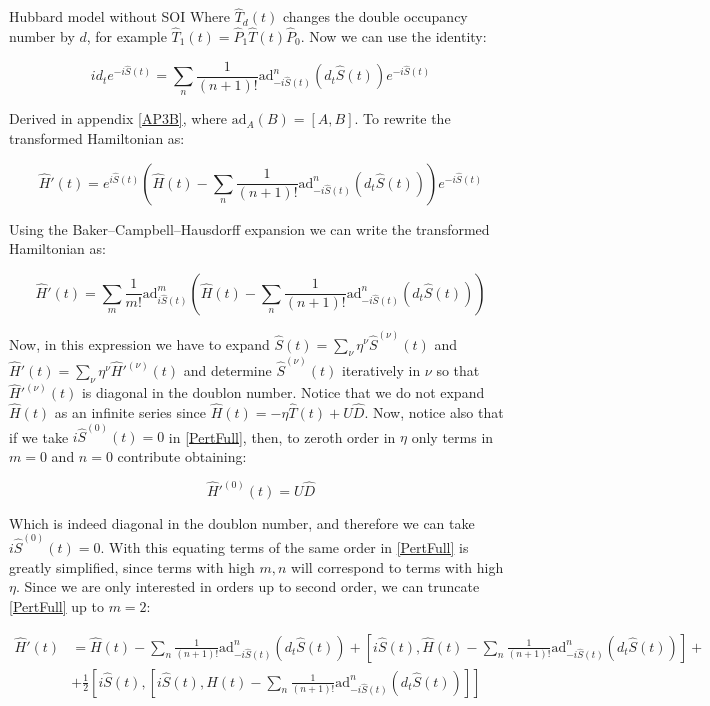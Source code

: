 \begin{section}{Hubbard model without SOI}
Where $\hat{T}_d(t)$ changes the double occupancy number by $d$, for example $\hat{T}_1(t) = \hat{P}_1 \hat{T}(t) \hat{P}_0$. Now we can use the identity:

\begin{equation}
id_t e^{-i\hat{S}(t)} = \sum_n \frac{1}{(n+1)!}\text{ad}_{-i\hat{S}(t)}^n (d_t \hat{S}(t))e^{-i\hat{S}(t)}
\end{equation}

Derived in appendix \ref{AP3B}, where $\text{ad}_A(B) = [A,B]$. To rewrite the transformed Hamiltonian as:

\begin{equation}
\hat{H}'(t) = e^{i\hat{S}(t)} \left( \hat{H}(t) - \sum_n \frac{1}{(n+1)!}\text{ad}_{-i\hat{S}(t)}^n (d_t \hat{S}(t)) \right) e^{-i\hat{S}(t)}
\end{equation}

Using the Baker–Campbell–Hausdorff expansion we can write the transformed Hamiltonian as:

\begin{equation}
\label{PertFull}
\hat{H}'(t) = \sum_m \frac{1}{m!} \text{ad}_{i\hat{S}(t)}^m \left( \hat{H}(t) - \sum_n \frac{1}{(n+1)!}\text{ad}_{-i\hat{S}(t)}^n (d_t \hat{S}(t)) \right)
\end{equation}

Now, in this expression we have to expand $\hat{S}(t) = \sum_\nu \eta^\nu \hat{S}^{(\nu)}(t)$ and $\hat{H}'(t) = \sum_\nu \eta^\nu \hat{H}'^{(\nu)}(t)$ and determine $\hat{S}^{(\nu)}(t)$ iteratively in $\nu$ so that $\hat{H}'^{(\nu)}(t)$ is diagonal in the doublon number. Notice that we do not expand $\hat{H}(t)$ as an infinite series since $\hat{H}(t) = -\eta \hat{T}(t) + U\hat{D}$. Now, notice also that if we take $i\hat{S}^{(0)}(t)=0$ in \ref{PertFull}, then, to zeroth order in $\eta$ only terms in $m=0$ and $n=0$ contribute obtaining:

\begin{equation}
\hat{H}'^{(0)}(t) = U\hat{D}
\end{equation}

Which is indeed diagonal in the doublon number, and therefore we can take $i\hat{S}^{(0)}(t)=0$. With this equating terms of the same order in \ref{PertFull} is greatly simplified, since terms with high $m,n$ will correspond to terms with high $\eta$. Since we are only interested in orders up to second order, we can truncate \ref{PertFull} up to $m=2$:

\begin{align}
\label{PertTrunc}
\hat{H}'(t) &=  \hat{H}(t) - \sum_n \frac{1}{(n+1)!}\text{ad}_{-i\hat{S}(t)}^n (d_t \hat{S}(t)) + [i\hat{S}(t), \hat{H}(t) - \sum_n \frac{1}{(n+1)!}\text{ad}_{-i\hat{S}(t)}^n (d_t \hat{S}(t))] + \nonumber \\
&+ \frac{1}{2} [i\hat{S}(t),[i\hat{S}(t), \hat{H}(t) - \sum_n \frac{1}{(n+1)!}\text{ad}_{-i\hat{S}(t)}^n (d_t \hat{S}(t)) ]]
\end{align}


\end{section}
